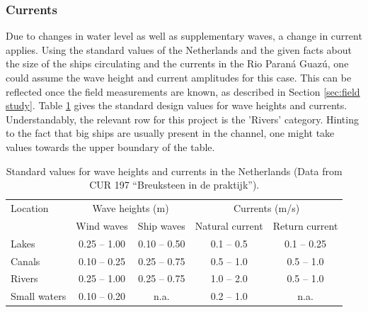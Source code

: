 \subsubsection{Currents}

Due to changes in water level as well as supplementary waves, a change in current applies. Using the standard values of the Netherlands and the given facts about the size of the ships circulating and the currents in the Rio Paraná Guazú, one could assume the wave height and current amplitudes for this case. This can be reflected once the field measurements are known, as described in Section \ref{sec:field study}.
Table \ref{tab:standard_values} gives the standard design values for wave heights and currents. Understandably, the relevant row for this project is the 'Rivers' category. Hinting to the fact that big ships are usually present in the channel, one might take values towards the upper boundary of the table.

\begin{table}[H]
    \centering
    \caption{Standard values for wave heights and currents in the Netherlands (Data from CUR 197 ``Breuksteen in de praktijk'').}
    \label{tab:standard_values}
    \begin{tabular}{lcccc}
        \toprule
        Location & \multicolumn{2}{c}{Wave heights (m)} & \multicolumn{2}{c}{Currents (m/s)} \\
        \cmidrule(lr){2-3} \cmidrule(l){4-5}
        & Wind waves & Ship waves & Natural current & Return current \\
        \midrule
        Lakes          & 0.25 -- 1.00  & 0.10 -- 0.50  & 0.1 -- 0.5  & 0.1 -- 0.25 \\
        Canals         & 0.10 -- 0.25  & 0.25 -- 0.75  & 0.5 -- 1.0  & 0.5 -- 1.0  \\
        Rivers         & 0.25 -- 1.00  & 0.25 -- 0.75  & 1.0 -- 2.0  & 0.5 -- 1.0  \\
        Small waters   & 0.10 -- 0.20  & n.a.          & 0.2 -- 1.0  & n.a.       \\
        \bottomrule
    \end{tabular}
\end{table}


